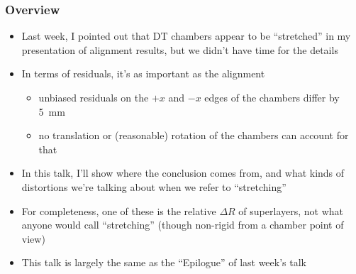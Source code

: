 \documentclass[compress]{beamer}
\begin{document}
\begin{frame}
\frametitle{Overview}

\begin{itemize}
\item Last week, I pointed out that DT chambers appear to be ``stretched''
  in my presentation of alignment results, but we didn't have time for the details

\item In terms of residuals, it's as important as the
  alignment
\begin{itemize}
\item unbiased residuals on the $+x$ and $-x$ edges of the chambers
  differ by 5~mm
\item no translation or (reasonable) rotation of the chambers can
  account for that
\end{itemize}

\item In this talk, I'll show where the conclusion comes from, and
  what kinds of distortions we're talking about when we refer to ``stretching''

\item For completeness, one of these is the relative $\Delta R$ of
  superlayers, not what anyone would call ``stretching'' (though
  non-rigid from a chamber point of view)

\item This talk is largely the same as the ``Epilogue'' of last week's talk
\end{itemize}
\end{frame}
\end{document}
